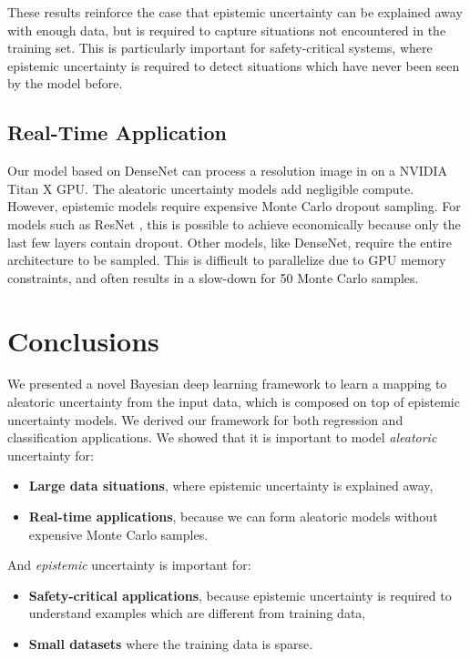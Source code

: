 \documentclass{article}
\begin{document}
These results reinforce the case that epistemic uncertainty can be explained away with enough data, but is required to capture situations not encountered in the training set. This is particularly important for safety-critical systems, where epistemic uncertainty is required to detect situations which have never been seen by the model before.







\subsection{Real-Time Application}

Our model based on DenseNet \cite{jegou2016one} can process a  resolution image in  on a NVIDIA Titan X GPU. The aleatoric uncertainty models add negligible compute. However, epistemic models require expensive Monte Carlo dropout sampling. For models such as ResNet \cite{he2004multiscale}, this is possible to achieve economically because only the last few layers contain dropout. Other models, like DenseNet, require the entire architecture to be sampled. This is difficult to parallelize due to GPU memory constraints, and often results in a  slow-down for 50 Monte Carlo samples.

\section{Conclusions}

We presented a novel Bayesian deep learning framework to learn a mapping to aleatoric uncertainty from the input data, which is composed on top of epistemic uncertainty models. We derived our framework for both regression and classification applications. We showed that it is important to model \textit{aleatoric} uncertainty for:
\begin{itemize}[topsep=0pt,itemsep=-1ex,partopsep=1ex,parsep=1ex]
\item \textbf{Large data situations}, where epistemic uncertainty is explained away,
\item \textbf{Real-time applications}, because we can form aleatoric models without expensive Monte Carlo samples.
\end{itemize}
And \textit{epistemic} uncertainty is important for:
\begin{itemize}[topsep=0pt,itemsep=-1ex,partopsep=1ex,parsep=1ex]
\item \textbf{Safety-critical applications}, because epistemic uncertainty is required to understand examples which are different from training data,
\item \textbf{Small datasets} where the training data is sparse.
\end{itemize}
\end{document}
